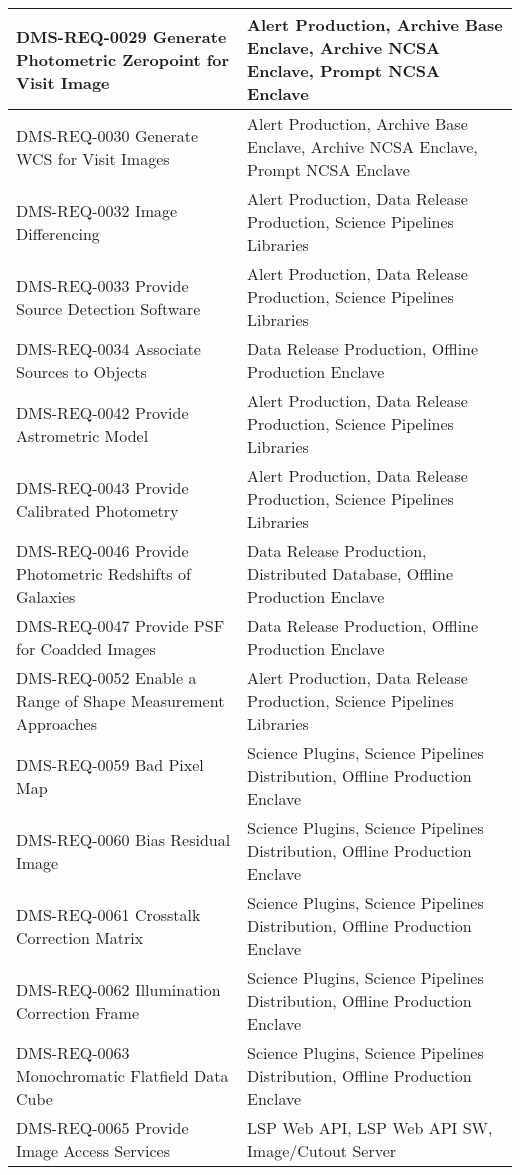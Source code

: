 \begin{longtable}{p{}p{}}
DMS-REQ-0029 Generate Photometric Zeropoint for Visit Image & Alert Production, Archive Base Enclave, Archive NCSA Enclave, Prompt NCSA Enclave \\ \hline
DMS-REQ-0030 Generate WCS for Visit Images & Alert Production, Archive Base Enclave, Archive NCSA Enclave, Prompt NCSA Enclave \\ \hline
DMS-REQ-0032 Image Differencing & Alert Production, Data Release Production, Science Pipelines Libraries \\ \hline
DMS-REQ-0033 Provide Source Detection Software & Alert Production, Data Release Production, Science Pipelines Libraries \\ \hline
DMS-REQ-0034 Associate Sources to Objects & Data Release Production, Offline Production Enclave \\ \hline
DMS-REQ-0042 Provide Astrometric Model & Alert Production, Data Release Production, Science Pipelines Libraries \\ \hline
DMS-REQ-0043 Provide Calibrated Photometry & Alert Production, Data Release Production, Science Pipelines Libraries \\ \hline
DMS-REQ-0046 Provide Photometric Redshifts of Galaxies & Data Release Production, Distributed Database, Offline Production Enclave \\ \hline
DMS-REQ-0047 Provide PSF for Coadded Images & Data Release Production, Offline Production Enclave \\ \hline
DMS-REQ-0052 Enable a Range of Shape Measurement Approaches & Alert Production, Data Release Production, Science Pipelines Libraries \\ \hline
DMS-REQ-0059 Bad Pixel Map & Science Plugins, Science Pipelines Distribution, Offline Production Enclave \\ \hline
DMS-REQ-0060 Bias Residual Image & Science Plugins, Science Pipelines Distribution, Offline Production Enclave \\ \hline
DMS-REQ-0061 Crosstalk Correction Matrix & Science Plugins, Science Pipelines Distribution, Offline Production Enclave \\ \hline
DMS-REQ-0062 Illumination Correction Frame & Science Plugins, Science Pipelines Distribution, Offline Production Enclave \\ \hline
DMS-REQ-0063 Monochromatic Flatfield Data Cube & Science Plugins, Science Pipelines Distribution, Offline Production Enclave \\ \hline
DMS-REQ-0065 Provide Image Access Services & LSP Web API, LSP Web API SW, Image/Cutout Server \\ \hline

\end{longtable}
